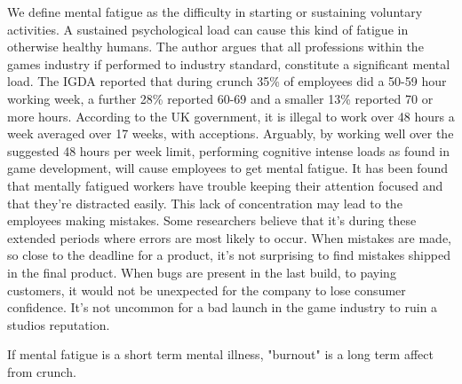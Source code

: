 \documentclass{scrartcl}
\begin{document}
We define mental fatigue as the difficulty in starting or sustaining voluntary activities\cite{chaudhuri2004fatigue}. A sustained psychological load can cause this kind of fatigue in otherwise healthy humans\cite {mizuno2011mental}. The author argues that all professions within the games industry if performed to industry standard, constitute a significant mental load. The IGDA reported that during crunch 35\% of employees did a 50-59 hour working week, a further 28\% reported 60-69 and a smaller 13\% reported 70 or more hours\cite[p.20]{weststarlegault2016}. According to the UK government, it is illegal to work over 48 hours a week averaged over 17 weeks, with acceptions\cite{maximumweeklyhours}. Arguably, by working well over the suggested 48 hours per week limit, performing cognitive intense loads as found in game development, will cause employees to get mental fatigue. It has been found that mentally fatigued workers have trouble keeping their attention focused and that they're distracted easily\cite{bartlett1943ferrier}. This lack of concentration may lead to the employees making mistakes. Some researchers believe that it's during these extended periods where errors are most likely to occur\cite{olson2011overtime}. When mistakes are made, so close to the deadline for a product, it's not surprising to find mistakes shipped in the final product. When bugs are present in the last build, to paying customers, it would not be unexpected for the company to lose consumer confidence.  It's not uncommon for a bad launch in the game industry to ruin a studios reputation. 

If mental fatigue is a short term mental illness, "burnout" is a long term affect from crunch. 


\end{document}
